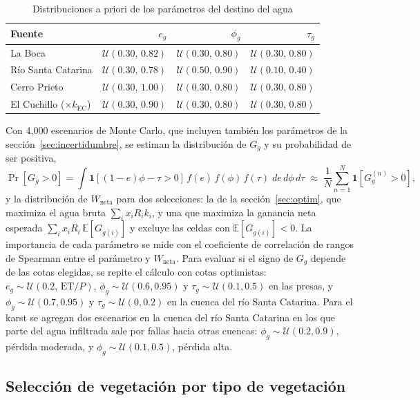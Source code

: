 \documentclass[11pt,letterpaper]{article}
\begin{document}
\begin{table}[H]\centering\small
\caption{Distribuciones a priori de los parámetros del destino del agua}\label{tab:priores}
\begin{tabularx}{\linewidth}{Xrrr}
\toprule
Fuente & $e_g$ & $\phi_g$ & $\tau_g$ \\
\midrule
La Boca & $\mathcal U(0.30,\,0.82)$ & $\mathcal U(0.30,\,0.80)$ & $\mathcal U(0.30,\,0.80)$ \\
Río Santa Catarina & $\mathcal U(0.30,\,0.78)$ & $\mathcal U(0.50,\,0.90)$ & $\mathcal U(0.10,\,0.40)$ \\
Cerro Prieto & $\mathcal U(0.30,\,1.00)$ & $\mathcal U(0.30,\,0.80)$ & $\mathcal U(0.30,\,0.80)$ \\
El Cuchillo ($\times k_{\text{EC}}$) & $\mathcal U(0.30,\,0.90)$ & $\mathcal U(0.30,\,0.80)$ & $\mathcal U(0.30,\,0.80)$ \\
\bottomrule
\end{tabularx}
\end{table}

Con 4,000 escenarios de Monte Carlo, que incluyen también los parámetros de la sección~\ref{sec:incertidumbre}, se estiman la distribución de $G_g$ y su probabilidad de ser positiva,
\begin{equation}
\Pr[G_g>0]=\int \mathbf 1\!\left[(1-e)\phi-\tau>0\right]\,f(e)\,f(\phi)\,f(\tau)\;de\,d\phi\,d\tau\;\approx\;\frac1N\sum_{n=1}^N \mathbf 1\!\left[G_g^{(n)}>0\right],
\end{equation}
y la distribución de $W_{\text{neta}}$ para dos selecciones: la de la sección~\ref{sec:optim}, que maximiza el agua bruta $\sum_i x_iR_ik_i$, y una que maximiza la ganancia neta esperada $\sum_i x_iR_i\,\mathbb E[G_{g(i)}]$ y excluye las celdas con $\mathbb E[G_{g(i)}]<0$. La importancia de cada parámetro se mide con el coeficiente de correlación de rangos de Spearman entre el parámetro y $W_{\text{neta}}$. Para evaluar si el signo de $G_g$ depende de las cotas elegidas, se repite el cálculo con cotas optimistas: $e_g\sim\mathcal U(0.2,\,\text{ET}/P)$, $\phi_g\sim\mathcal U(0.6,0.95)$ y $\tau_g\sim\mathcal U(0.1,0.5)$ en las presas, y $\phi_g\sim\mathcal U(0.7,0.95)$ y $\tau_g\sim\mathcal U(0,0.2)$ en la cuenca del río Santa Catarina. Para el karst se agregan dos escenarios en la cuenca del río Santa Catarina en los que parte del agua infiltrada sale por fallas hacia otras cuencas: $\phi_g\sim\mathcal U(0.2,0.9)$, pérdida moderada, y $\phi_g\sim\mathcal U(0.1,0.5)$, pérdida alta.

\subsection{Selección de vegetación por tipo de vegetación}\label{sec:vegetacion}
\end{document}
